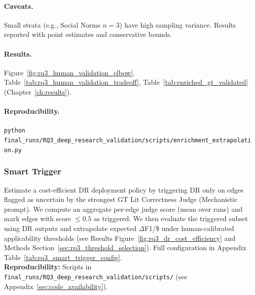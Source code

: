 \paragraph{Caveats.}
Small strata (e.g., Social Norms $n=3$) have high sampling variance. Results reported with point estimates and conservative bounds.

\paragraph{Results.}
Figure~\ref{fig:rq3_human_validation_elbow}, Table~\ref{tab:rq3_human_validation_tradeoff}, Table~\ref{tab:enriched_gt_validated} (Chapter~\ref{ch:results}).

\paragraph{Reproducibility.}
\texttt{python final\_runs/RQ3\_deep\_research\_validation/scripts/enrichment\_extrapolation.py}

\subsubsection{Smart Trigger}
\label{sec:rq3_smart_trigger}
Estimate a cost-efficient DR deployment policy by triggering DR only on edges flagged as uncertain by the strongest GT Lit Correctness Judge (Mechanistic prompt). We compute an aggregate per-edge judge score (mean over runs) and mark edges with score $\leq 0.5$ as triggered. We then evaluate the triggered subset using DR outputs and extrapolate expected $\Delta$F1/\$ under human-calibrated applicability thresholds (see Results Figure~\ref{fig:rq3_dr_cost_efficiency} and Methods Section~\ref{sec:rq3_threshold_selection}). Full configuration in Appendix Table~\ref{tab:rq3_smart_trigger_config}.\\
\textbf{Reproducibility:} Scripts in \texttt{final\_runs/RQ3\_deep\_research\_validation/scripts/} (see Appendix~\ref{sec:code_availability}).

\endgroup
